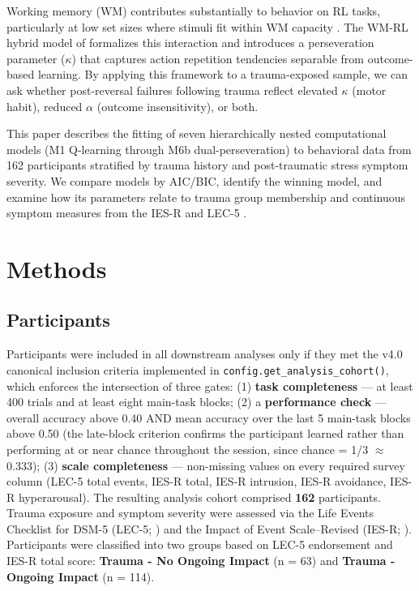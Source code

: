 \documentclass{article}
\begin{document}
Working memory (WM) contributes substantially to behavior on RL tasks,
particularly at low set sizes where stimuli fit within WM capacity
\citep{collins2012how, collins2014working}. The WM-RL hybrid model of
\citet{senta2025} formalizes this interaction and introduces a
perseveration parameter (\(\kappa\)) that captures action repetition
tendencies separable from outcome-based learning. By applying this
framework to a trauma-exposed sample, we can ask whether post-reversal
failures following trauma reflect elevated \(\kappa\) (motor habit),
reduced \(\alpha\) (outcome insensitivity), or both.

This paper describes the fitting of seven hierarchically nested
computational models (M1 Q-learning through M6b dual-perseveration) to
behavioral data from 162 participants stratified by trauma history and
post-traumatic stress symptom severity. We compare models by AIC/BIC,
identify the winning model, and examine how its parameters relate to
trauma group membership and continuous symptom measures from the IES-R
\citep{weiss2007impact} and LEC-5 \citep{weathers2013life}.

\section{Methods}\label{sec-methods}

\subsection{Participants}\label{sec-participants}

Participants were included in all downstream analyses only if they met
the v4.0 canonical inclusion criteria implemented in
\texttt{config.get\_analysis\_cohort()}, which enforces the intersection
of three gates: (1) \textbf{task completeness} --- at least 400 trials
and at least eight main-task blocks; (2) a \textbf{performance check}
--- overall accuracy above 0.40 AND mean accuracy over the last 5
main-task blocks above 0.50 (the late-block criterion confirms the
participant learned rather than performing at or near chance throughout
the session, since chance = 1/3 \(\approx\) 0.333); (3) \textbf{scale
completeness} --- non-missing values on every required survey column
(LEC-5 total events, IES-R total, IES-R intrusion, IES-R avoidance,
IES-R hyperarousal). The resulting analysis cohort comprised
\textbf{162} participants. Trauma exposure and symptom severity were
assessed via the Life Events Checklist for DSM-5 (LEC-5;
\citet{weathers2013life}) and the Impact of Event Scale--Revised (IES-R;
\citet{weiss2007impact}). Participants were classified into two groups
based on LEC-5 endorsement and IES-R total score: \textbf{Trauma - No
Ongoing Impact} (n = 63) and \textbf{Trauma - Ongoing Impact} (n = 114).
\end{document}
